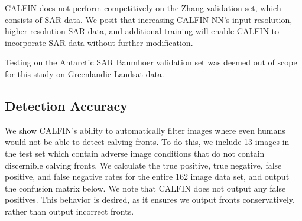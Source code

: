 \documentclass[tc, manuscript]{copernicus}
\begin{document}
CALFIN does not perform competitively on the Zhang validation set, which consists of SAR data. We posit that increasing CALFIN-NN's input resolution, higher resolution SAR data, and additional training will enable CALFIN to incorporate SAR data without further modification. 

Testing on the Antarctic SAR Baumhoer validation set was deemed out of scope for this study on Greenlandic Landsat data.

\begin{table}[h]
\caption{Error estimate and classification accuracy for all available combinations of model-validation sets. }
\centering
{}
\label{Error}
\end{table}

\subsection{Detection Accuracy}
We show CALFIN's ability to automatically filter images where even humans would not be able to detect calving fronts. To do this, we include 13 images in the test set which contain adverse image conditions that do not contain discernible calving fronts. We calculate the true positive, true negative, false positive, and false negative rates for the entire 162 image data set, and output the confusion matrix below. We note that CALFIN does not output any false positives. This behavior is desired, as it ensures we output fronts conservatively, rather than output incorrect fronts.
\end{document}
